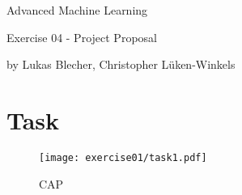 \documentclass[12pt,a4paper]{article}
\begin{document}
\centerline{\LARGE Advanced Machine Learning}\vspace{1em}
\centerline{\Large Exercise 04 - Project Proposal}\vspace{0.5em}
\centerline{\large by Lukas Blecher, Christopher L\"uken-Winkels}%

\section*{Task}

\begin{figure}[H]
    \centering
    \texttt{[image: exercise01/task1.pdf]}
    \caption{CAP}
    \label{fig:bar2}
\end{figure}
\end{document}
